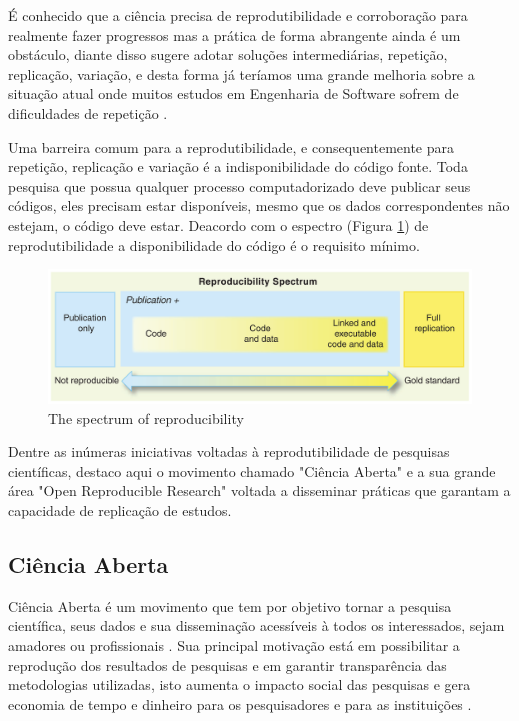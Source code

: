 \documentclass[qual, classic, a4paper]{ufbathesis}
\begin{document}
É conhecido que a ciência precisa de reprodutibilidade e corroboração para
realmente fazer progressos mas a prática de forma abrangente ainda é um
obstáculo, diante disso  sugere adotar soluções
intermediárias, repetição, replicação, variação, e desta forma já teríamos uma
grande melhoria sobre a situação atual onde muitos estudos em Engenharia de
Software sofrem de dificuldades de repetição \cite{Tang2016}.

Uma barreira comum para a reprodutibilidade, e consequentemente para
repetição, replicação e variação é a indisponibilidade do código fonte.  Toda
pesquisa que possua qualquer processo computadorizado deve publicar seus
códigos, eles precisam estar disponíveis, mesmo que os dados correspondentes
não estejam, o código deve estar. Deacordo com o espectro (Figura
\ref{reproducibility-spectrum}) de reprodutibilidade a disponibilidade do
código é o requisito mínimo.

\begin{figure}[h]
  \center
  \includegraphics[scale=0.25]{imagens/reproducibility-spectrum.png}
  \caption{The spectrum of reproducibility\cite{Peng2011}}
  \label{reproducibility-spectrum}
\end{figure}

Dentre as inúmeras iniciativas voltadas à reprodutibilidade
de pesquisas científicas, destaco aqui o movimento chamado "Ciência Aberta" e
a sua grande área "Open Reproducible Research" voltada a disseminar práticas
que garantam a capacidade de replicação de estudos.

\subsection{Ciência Aberta}

Ciência Aberta é um movimento que tem por objetivo tornar a pesquisa
científica, seus dados e sua disseminação acessíveis à todos os interessados,
sejam amadores ou profissionais \cite{WikipediaOpenScience}. Sua principal
motivação está em possibilitar a reprodução dos resultados de pesquisas e em
garantir transparência das metodologias utilizadas, isto aumenta o impacto
social das pesquisas e gera economia de tempo e dinheiro para os pesquisadores
e para as instituições \cite{Nesta2010}.
\end{document}

